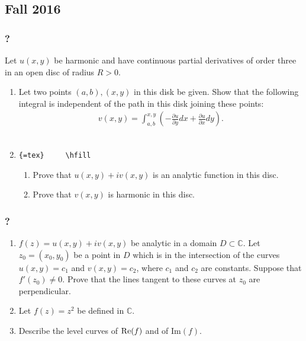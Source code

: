 \hypertarget{fall-2016}{%
\subsection{Fall 2016}\label{fall-2016}}

\hypertarget{section-186}{%
\subsubsection{?}\label{section-186}}

Let \(u(x,y)\) be harmonic and have continuous partial derivatives of
order three in an open disc of radius \(R>0\).

\begin{enumerate}
\def\labelenumi{(\alph{enumi})}
\item
  Let two points \((a,b), (x,y)\) in this disk be given. Show that the
  following integral is independent of the path in this disk joining
  these points:
  \begin{align*}v(x,y) = \int_{a,b}^{x,y} ( -\frac{\partial u}{\partial y}dx +  \frac{\partial u}{\partial x}dy).\end{align*}
  \\
\item
  \texttt{\{=tex\}\ \ \ \ \ \textbackslash{}hfill}

  \begin{enumerate}
  \def\labelenumii{(\roman{enumii})}
  \item
    Prove that \(u(x,y)+i v(x,y)\) is an analytic function in this disc.
  \item
    Prove that \(v(x,y)\) is harmonic in this disc.
  \end{enumerate}
\end{enumerate}

\hypertarget{section-187}{%
\subsubsection{?}\label{section-187}}

\begin{enumerate}
\def\labelenumi{(\alph{enumi})}
\item
  \(f(z)= u(x,y) +i v(x,y)\) be analytic in a domain
  \(D\subset {\mathbb C}\). Let \(z_0=(x_0,y_0)\) be a point in \(D\)
  which is in the intersection of the curves \(u(x,y)= c_1\) and
  \(v(x,y)=c_2\), where \(c_1\) and \(c_2\) are constants. Suppose that
  \(f'(z_0)\neq 0\). Prove that the lines tangent to these curves at
  \(z_0\) are perpendicular.
\item
  Let \(f(z)=z^2\) be defined in \({\mathbb C}\).
\item
  Describe the level curves of \(\mbox{\textrm Re}{(f)}\) and of
  \(\mbox{Im}{(f)}\).
\end{enumerate}

